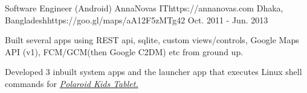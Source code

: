 \begin{workentries}
  \workentry
    {Software Engineer (Android)} %
    {AnnaNovas IT}{https://annanovas.com} %
    {Dhaka, Bangladesh}{https://goo.gl/maps/aA12F5zMTg42} %
    {Oct. 2011 - Jun. 2013} %
    {
      \begin{workitems} %
        \item {Built several apps using REST api, sqlite, custom views/controls, Google Maps API (v1), FCM/GCM(then Google C2DM) etc from ground up.}
        \item {Developed 3 inbuilt system apps and the launcher app that executes Linux shell commands for }{\href{https://www.polaroid.com/kids-tablet-2}{\textsl{Polaroid Kids Tablet.}}}
      \end{workitems}
    }

\end{workentries}
